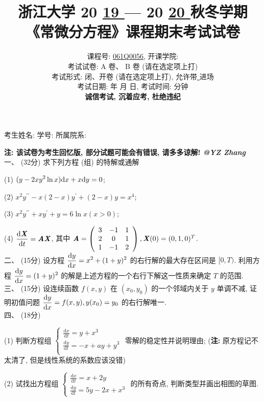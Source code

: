 \documentclass[UTF8]{ctexart}
\title{
\textbf{浙江大学 }20 \underline{ 19 } — 20 \underline{ 20 } \textbf{秋冬学期} \\
\textbf{《常微分方程》课程期末考试试卷}
}
\author{
课程号: \underline{ \quad061Q0056\quad }, 开课学院: \underline{ \quad数学科学学院\quad } \\
考试试卷: \checkmark A 卷、 B 卷 (请在选定项上打\checkmark) \\
考试形式: \checkmark 闭、开卷 (请在选定项上打\checkmark), 允许带\underline{ \quad无\quad  }进场 \\
考试日期: \underline{ \quad2020\quad } 年 \underline{ \quad01\quad } 月 \underline{ \quad09\quad } 日, 考试时间: \underline{ \quad120\quad }分钟 \\
\textbf{诚信考试, 沉着应考, 杜绝违纪}
}
\date{}
\begin{document}
\maketitle
\begin{center}
考生姓名: \underline{\quad\quad\quad\quad\quad\quad\quad\quad\quad} 学号: \underline{\quad\quad\quad\quad\quad\quad\quad\quad\quad} 所属院系: \underline{\quad\quad\quad\quad\quad\quad\quad\quad\quad}
\end{center}

\textbf{注: 该试卷为考生回忆版, 部分试题可能会有错误, 请多多谅解! \textit{@YZ Zhang}}
\\

一、 (32分) 求下列方程 (组) 的特解或通解

(1) $\displaystyle(y-2xy^2\ln x){\rm d}x+x{\rm d}y=0$;

(2) $\displaystyle x^2y^{\prime\prime}-x(2-x)y^{\prime}+(2-x)y=x^4$;

(3) $x^2y^{\prime\prime}+xy^{\prime}+y=6\ln x(x>0)$;

(4) $\displaystyle\frac{{\rm d}\textbf{\textit{X}}}{{\rm d}t}=\textbf{\textit{AX}}$, 其中 $\textbf{\textit{A}}=
\left(\begin{array}{ccc}
3 & -1 & 1 \\
2 & 0 & 1 \\
1 & -1 & 2
\end{array}\right),\textbf{\textit{X}}(0)=(0,1,0)^T$.
\\

二、 (15分) 设方程 $\displaystyle\frac{{\rm d}y}{{\rm d}x}=x^2+(1+y)^2$ 的右行解的最大存在区间是 $[0,T)$. 利用方程 $\displaystyle\frac{{\rm d}y}{{\rm d}x}=(1+y)^2$ 的解是上述方程的一个右行下解这一性质来确定 $T$ 的范围.
\\

三、 (15分) 设连续函数 $f(x,y)$ 在 $(x_0,y_0)$ 的一个邻域内关于 $y$ 单调不减, 证明初值问题 $\displaystyle\frac{{\rm d}y}{{\rm d}x}=f(x,y), y(x_0)=y_0$ 的右行解唯一.
\\

四、 (18分)

(1) 判断方程组 $\begin{cases}
	\displaystyle\frac{\text{d}x}{\text{d}t}=y+x^3\\
	\displaystyle\frac{\text{d}y}{\text{d}t}=-x+ay+y^3\\
    \end{cases}$ 零解的稳定性并说明理由; (\textbf{注:} 原方程记不太清了, 但是线性系统的系数应该没错)

(2) 试找出方程组 $\begin{cases}
              \displaystyle\frac{\text{d}x}{\text{d}t}=x+2y\\
              \displaystyle\frac{\text{d}y}{\text{d}t}=5y-2x+x^3
            \end{cases}$ 的所有奇点, 判断类型并画出相图的草图.
\\
\end{document}
